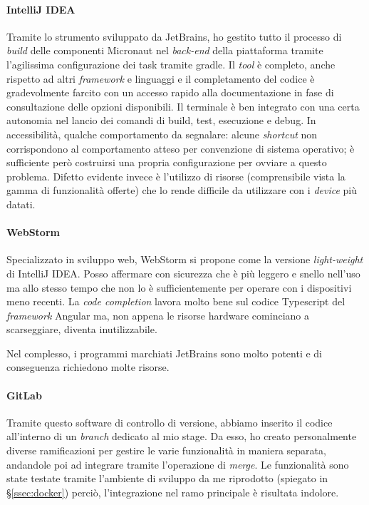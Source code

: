 \paragraph{IntelliJ IDEA}
Tramite lo strumento sviluppato da JetBrains, ho gestito tutto il processo di \textit{build} delle componenti Micronaut nel \textit{back-end} della piattaforma tramite l'agilissima configurazione dei task tramite \gls{gradle}. Il \textit{tool} è completo, anche rispetto ad altri \textit{framework} e linguaggi e il completamento del codice è gradevolmente farcito con un accesso rapido alla documentazione in fase di consultazione delle opzioni disponibili. Il terminale è ben integrato con una certa autonomia nel lancio dei comandi di build, test, esecuzione e debug. In accessibilità, qualche comportamento da segnalare: alcune \textit{shortcut} non corrispondono al comportamento atteso per convenzione di sistema operativo; è sufficiente però costruirsi una propria configurazione per ovviare a questo problema. Difetto evidente invece è l'utilizzo di risorse (comprensibile vista la gamma di funzionalità offerte) che lo rende difficile da utilizzare con i \textit{device} più datati.
\paragraph{WebStorm}
Specializzato in sviluppo web, WebStorm si propone come la versione \textit{light-weight} di IntelliJ IDEA. Posso affermare con sicurezza che è più leggero e snello nell'uso ma allo stesso tempo che non lo è sufficientemente per operare con i dispositivi meno recenti. La \textit{code completion} lavora molto bene sul codice Typescript del \textit{framework} Angular ma, non appena le risorse hardware cominciano a scarseggiare, diventa inutilizzabile.

Nel complesso, i programmi marchiati JetBrains sono molto potenti e di conseguenza richiedono molte risorse.
\paragraph{GitLab}
Tramite questo software di controllo di versione, abbiamo inserito il codice all'interno di un \textit{branch} dedicato al mio stage. Da esso, ho creato personalmente diverse ramificazioni per gestire le varie funzionalità in maniera separata, andandole poi ad integrare tramite l'operazione di \textit{merge}. Le funzionalità sono state testate tramite l'ambiente di sviluppo da me riprodotto (spiegato in \S\ref{ssec:docker}) perciò, l'integrazione nel ramo principale è risultata indolore.

